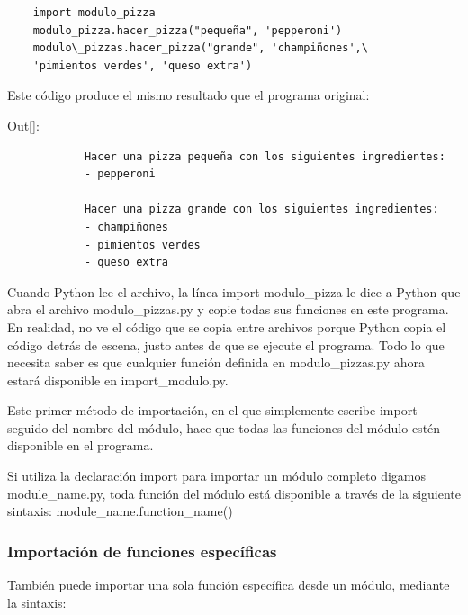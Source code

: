 \hspace{-2.3cm}{\ttfamily \scriptsize import}

\vspace{-0.2cm}
\hspace{-2.4cm}{\ttfamily \scriptsize \_pizza.py}\vspace{-0.84cm}
\begin{lstlisting}
	import modulo_pizza
	modulo_pizza.hacer_pizza("pequeña", 'pepperoni')
	modulo\_pizzas.hacer_pizza("grande", 'champiñones',\
	'pimientos verdes', 'queso extra')	
\end{lstlisting}Este código produce el mismo resultado que el programa original:
\vspace{0.08cm}

{\ttfamily\scriptsize\noindent Out[]:\vspace{-0.3cm}	
	{\color{blue} 	
		\begin{verbatim}
			Hacer una pizza pequeña con los siguientes ingredientes:
			- pepperoni
			
			Hacer una pizza grande con los siguientes ingredientes:
			- champiñones
			- pimientos verdes
			- queso extra	
		\end{verbatim}
}}


Cuando Python lee el archivo, la línea {\ttfamily import modulo\_pizza} le dice a Python que abra el archivo {\ttfamily modulo\_pizzas.py} y copie todas sus funciones en este programa. En realidad, no ve el código que se copia entre archivos porque Python copia el 
código detrás de escena, justo antes de que se ejecute el programa. Todo lo que necesita
saber es que cualquier función definida en  {\ttfamily modulo\_pizzas.py } ahora estará disponible en {\ttfamily import\_modulo.py}.


Este primer método de importación, en el que simplemente escribe {\ttfamily import} seguido del nombre del módulo, hace que todas las funciones del módulo estén disponible en el programa. 

Si utiliza la declaración {\ttfamily import} para importar un módulo completo digamos {\ttfamily module\_name.py}, toda función del módulo está disponible a través de la siguiente sintaxis: {\ttfamily module\_name.function\_name()}

\subsubsection{Importación de funciones específicas}

También puede importar  una sola función específica desde un módulo, mediante la sintaxis:

